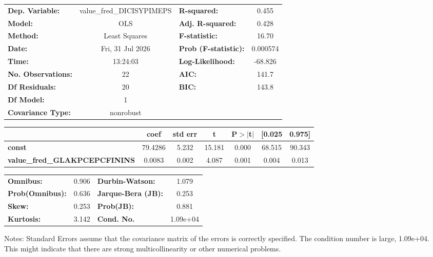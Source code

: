 \begin{center}
\begin{tabular}{lclc}
\toprule
\textbf{Dep. Variable:}               & value\_fred\_DICISYPIMEPS & \textbf{  R-squared:         } &     0.455   \\
\textbf{Model:}                       &            OLS            & \textbf{  Adj. R-squared:    } &     0.428   \\
\textbf{Method:}                      &       Least Squares       & \textbf{  F-statistic:       } &     16.70   \\
\textbf{Date:}                        &      Fri, 31 Jul 2026     & \textbf{  Prob (F-statistic):} &  0.000574   \\
\textbf{Time:}                        &          13:24:03         & \textbf{  Log-Likelihood:    } &   -68.826   \\
\textbf{No. Observations:}            &               22          & \textbf{  AIC:               } &     141.7   \\
\textbf{Df Residuals:}                &               20          & \textbf{  BIC:               } &     143.8   \\
\textbf{Df Model:}                    &                1          & \textbf{                     } &             \\
\textbf{Covariance Type:}             &         nonrobust         & \textbf{                     } &             \\
\bottomrule
\end{tabular}
\begin{tabular}{lcccccc}
                                      & \textbf{coef} & \textbf{std err} & \textbf{t} & \textbf{P$> |$t$|$} & \textbf{[0.025} & \textbf{0.975]}  \\
\midrule
\textbf{const}                        &      79.4286  &        5.232     &    15.181  &         0.000        &       68.515    &       90.343     \\
\textbf{value\_fred\_GLAKPCEPCFININS} &       0.0083  &        0.002     &     4.087  &         0.001        &        0.004    &        0.013     \\
\bottomrule
\end{tabular}
\begin{tabular}{lclc}
\textbf{Omnibus:}       &  0.906 & \textbf{  Durbin-Watson:     } &    1.079  \\
\textbf{Prob(Omnibus):} &  0.636 & \textbf{  Jarque-Bera (JB):  } &    0.253  \\
\textbf{Skew:}          &  0.253 & \textbf{  Prob(JB):          } &    0.881  \\
\textbf{Kurtosis:}      &  3.142 & \textbf{  Cond. No.          } & 1.09e+04  \\
\bottomrule
\end{tabular}
\end{center}

Notes: \newline
 [1] Standard Errors assume that the covariance matrix of the errors is correctly specified. \newline
 [2] The condition number is large, 1.09e+04. This might indicate that there are \newline
 strong multicollinearity or other numerical problems.